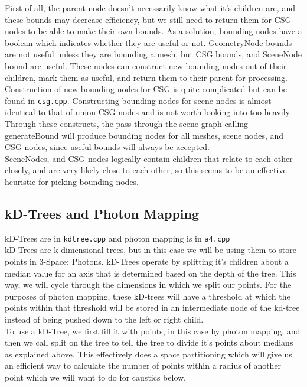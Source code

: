 \documentclass {article}
\begin{document}
First of all, the parent node doesn't necessarily know what it's children are,
and these bounds may decrease efficiency, but we still need to return them for
CSG nodes to be able to make their own bounds.  As a solution, bounding nodes
have a boolean which indicates whether they are useful or not.  GeometryNode
bounds are not useful unless they are bounding a mesh, but CSG bounds, and
SceneNode bound are useful.  These nodes can construct new bounding nodes out of
their children, mark them as useful, and return them to their parent for
processing.\\

Construction of new bounding nodes for CSG is quite complicated but can be found
in \verb!csg.cpp!.  Constructing bounding nodes for scene nodes is almost
identical to that of union CSG nodes and is not worth looking into too
heavily.\\

Through these constructs, the pass through the scene graph calling generateBound
will produce bounding nodes for all meshes, scene nodes, and CSG nodes, since
useful bounds will always be accepted.\\

SceneNodes, and CSG nodes logically contain children that relate to each other
closely, and are very likely close to each other, so this seems to be an
effective heuristic for picking bounding nodes.\\

\subsection{kD-Trees and Photon Mapping}
kD-Trees are in \verb!kdtree.cpp! and photon mapping is in \verb!a4.cpp!\\

kD-Trees are k-dimensional trees, but in this case we will be using them to
store points in 3-Space: Photons.  kD-Trees operate by splitting it's children
about a median value for an axis that is determined based on the depth of the
tree.  This way, we will cycle through the dimensions in which we split our
points.  For the purposes of photon mapping, these kD-trees will have a
threshold at which the points within that threshold will be stored in an
intermediate node of the kd-tree instead of being pushed down to the left or
right child.\\

To use a kD-Tree, we first fill it with points, in this case by photon mapping,
and then we call split on the tree to tell the tree to divide it's points about
medians as explained above.  This effectively does a space partitioning which
will give us an efficient way to calculate the number of points within a radius
of another point which we will want to do for caustics below.\\
\end{document}
